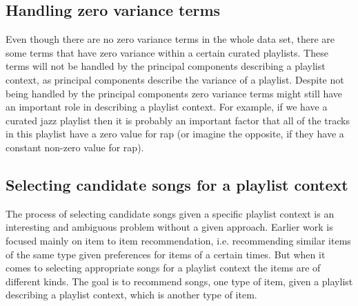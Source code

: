 \documentclass[a4paper,11pt]{kth-mag}
\begin{document}
\subsection{Handling zero variance terms}
Even though there are no zero variance terms in the whole data set, there are some terms that have zero variance within a certain curated playlists. These terms will not be handled by the principal components describing a playlist context, as principal components describe the variance of a playlist. Despite not being handled by the principal components zero variance terms might still have an important role in describing a playlist context. For example, if we have a curated jazz playlist then it is probably an important factor that all of the tracks in this playlist have a zero value for rap (or imagine the opposite, if they have a constant non-zero value for rap). 

\subsection{Selecting candidate songs for a playlist context}
The process of selecting candidate songs given a specific playlist context is an interesting and ambiguous problem without a given approach. Earlier work is focused mainly on item to item recommendation, i.e. recommending similar items of the same type given preferences for items of a certain times. But when it comes to selecting appropriate songs for a playlist context the items are of different kinds. The goal is to recommend songs, one type of item, given a playlist describing a playlist context, which is another type of item. 
\end{document}
